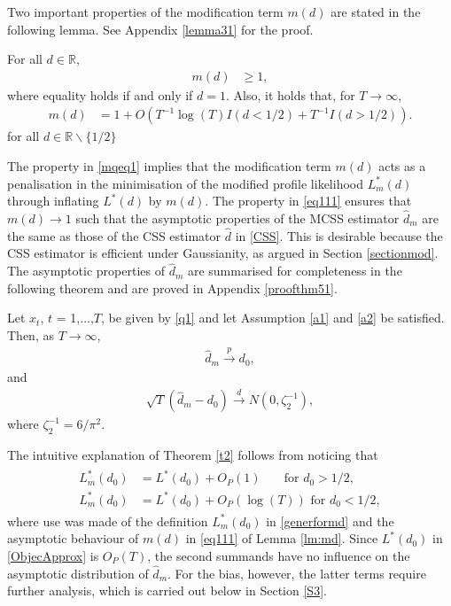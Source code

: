 {{Two important properties of the modification term $m(d)$ are stated in the following lemma. See Appendix \ref{lemma31} for the proof. 

\begin{lemma} \label{lm:md}
  For all $d \in \mathbb{R}$,
  \begin{align}
    m(d) &\geq 1, \label{mqeq1}
    \end{align}
    where equality holds if and only if $d = 1$. Also, it holds that, for $T \rightarrow \infty$,
    \begin{align}
    m(d) &= 1 + O(T^{-1}\log(T) I(d < 1/2) + T^{-1} I(d > 1/2) ). \label{eq111} 
  \end{align}
  for all $d \in \mathbb{R} \backslash \{1/2\}$
\end{lemma}

The property in \eqref{mqeq1} implies that the modification term $m(d)$ acts as a penalisation in the minimisation of the modified profile likelihood $L_m^*(d)$ through inflating $L^*(d)$ by $m(d)$.  The property in
\eqref{eq111} ensures that $m(d) \rightarrow 1$ such that the asymptotic properties of the MCSS estimator $\hat d_m$ are the same as those of the CSS estimator $\hat d$ in \eqref{CSS}. This is desirable because the CSS estimator
is efficient under Gaussianity, as argued in Section \ref{sectionmod}. The asymptotic properties of $\hat d_m$ are summarised for completeness in the following theorem and are proved in Appendix \ref{proofthm51}.
\begin{theorem}\label{t2} 
Let $x_t$, $t$ = 1,$\ldots$,$T$, be given by \eqref{q1} and let Assumption \ref{a1} and \ref{a2} be satisfied. Then, as $T \rightarrow \infty$, 
\begin{align}
    \hat{d}_{m} \overset{p}{\rightarrow} d_0,
\end{align}
and
\begin{align}
    \sqrt{T}(\hat{d}_{m}  - d_0) \xrightarrow{d} N(0,\zeta^{-1}_2), \label{mcssdis}
\end{align}
where $\zeta^{-1}_2 = 6/\pi^2$.
\end{theorem}

The intuitive explanation of Theorem \ref{t2} follows from noticing that
\begin{align}
\label{ObjecApprox}
\begin{split}
    L^*_{m}(d_0) &=  L^*(d_0) + O_P(1) \  \ \  \ \ \ \ \text{ for }d_0 > 1/2, \\
    L^*_{m}(d_0) &=  L^*(d_0) + O_P(\log(T))\text{ for }d_0 < 1/2, 
\end{split}
\end{align}
where use was made of the definition $L^*_{m}(d_0)$ in \eqref{generformd} and the asymptotic behaviour of $m(d)$ in \eqref{eq111} of Lemma \ref{lm:md}. Since $ L^*(d_0)$ in \eqref{ObjecApprox} is $O_P(T)$, the second summands have no influence on the asymptotic distribution of $\hat{d}_{m}$. For the bias, however, the latter terms require further analysis, which is carried out below in Section \ref{S3}.


}}
